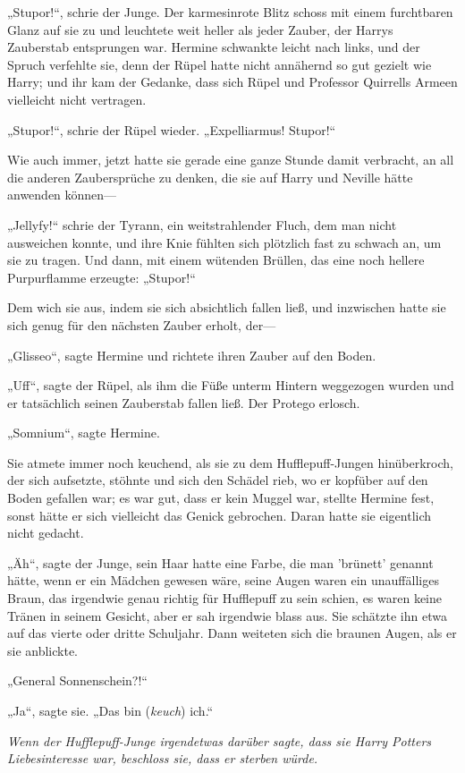{„Stupor!“, schrie der Junge. Der karmesinrote Blitz schoss mit einem furchtbaren Glanz auf sie zu und leuchtete weit heller als jeder Zauber, der Harrys Zauberstab entsprungen war. Hermine schwankte leicht nach links, und der Spruch verfehlte sie, denn der Rüpel hatte nicht annähernd so gut gezielt wie Harry; und ihr kam der Gedanke, dass sich Rüpel und Professor Quirrells Armeen vielleicht nicht vertragen.

„Stupor!“, schrie der Rüpel wieder. „Expelliarmus! Stupor!“

Wie auch immer, jetzt hatte sie gerade eine ganze Stunde damit verbracht, an all die anderen Zaubersprüche zu denken, die sie auf Harry und Neville hätte anwenden können—

„Jellyfy!“ schrie der Tyrann, ein weitstrahlender Fluch, dem man nicht ausweichen konnte, und ihre Knie fühlten sich plötzlich fast zu schwach an, um sie zu tragen. Und dann, mit einem wütenden Brüllen, das eine noch hellere Purpurflamme erzeugte: „Stupor!“

Dem wich sie aus, indem sie sich absichtlich fallen ließ, und inzwischen hatte sie sich genug für den nächsten Zauber erholt, der—

„Glisseo“, sagte Hermine und richtete ihren Zauber auf den Boden.

„Uff“, sagte der Rüpel, als ihm die Füße unterm Hintern weggezogen wurden und er tatsächlich seinen Zauberstab fallen ließ. Der Protego erlosch.

„Somnium“, sagte Hermine.

Sie atmete immer noch keuchend, als sie zu dem Hufflepuff-Jungen hinüberkroch, der sich aufsetzte, stöhnte und sich den Schädel rieb, wo er kopfüber auf den Boden gefallen war; es war gut, dass er kein Muggel war, stellte Hermine fest, sonst hätte er sich vielleicht das Genick gebrochen. Daran hatte sie eigentlich nicht gedacht.

„Äh“, sagte der Junge, sein Haar hatte eine Farbe, die man 'brünett' genannt hätte, wenn er ein Mädchen gewesen wäre, seine Augen waren ein unauffälliges Braun, das irgendwie genau richtig für Hufflepuff zu sein schien, es waren keine Tränen in seinem Gesicht, aber er sah irgendwie blass aus. Sie schätzte ihn etwa auf das vierte oder dritte Schuljahr. Dann weiteten sich die braunen Augen, als er sie anblickte.

„General Sonnenschein?!“

„Ja“, sagte sie. „Das bin (\emph{keuch}) ich.“

\emph{Wenn der Hufflepuff-Junge irgendetwas darüber sagte, dass sie Harry Potters Liebesinteresse war, beschloss sie, dass er sterben würde.}

}
